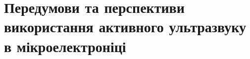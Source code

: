 \chapter{Передумови та перспективи використання активного ультразвуку в мікроелектроніці\label{Oglyad}}




